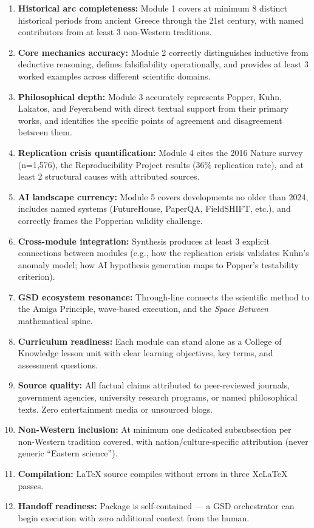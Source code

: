 \documentclass[11pt,letterpaper]{article}
\begin{document}
\begin{enumerate}
  \item \textbf{Historical arc completeness:} Module 1 covers at minimum 8 distinct historical periods from ancient Greece through the 21st century, with named contributors from at least 3 non-Western traditions.
  \item \textbf{Core mechanics accuracy:} Module 2 correctly distinguishes inductive from deductive reasoning, defines falsifiability operationally, and provides at least 3 worked examples across different scientific domains.
  \item \textbf{Philosophical depth:} Module 3 accurately represents Popper, Kuhn, Lakatos, and Feyerabend with direct textual support from their primary works, and identifies the specific points of agreement and disagreement between them.
  \item \textbf{Replication crisis quantification:} Module 4 cites the 2016 Nature survey (n=1,576), the Reproducibility Project results (36\% replication rate), and at least 2 structural causes with attributed sources.
  \item \textbf{AI landscape currency:} Module 5 covers developments no older than 2024, includes named systems (FutureHouse, PaperQA, FieldSHIFT, etc.), and correctly frames the Popperian validity challenge.
  \item \textbf{Cross-module integration:} Synthesis produces at least 3 explicit connections between modules (e.g., how the replication crisis validates Kuhn's anomaly model; how AI hypothesis generation maps to Popper's testability criterion).
  \item \textbf{GSD ecosystem resonance:} Through-line connects the scientific method to the Amiga Principle, wave-based execution, and the \emph{Space Between} mathematical spine.
  \item \textbf{Curriculum readiness:} Each module can stand alone as a College of Knowledge lesson unit with clear learning objectives, key terms, and assessment questions.
  \item \textbf{Source quality:} All factual claims attributed to peer-reviewed journals, government agencies, university research programs, or named philosophical texts. Zero entertainment media or unsourced blogs.
  \item \textbf{Non-Western inclusion:} At minimum one dedicated subsubsection per non-Western tradition covered, with nation/culture-specific attribution (never generic ``Eastern science'').
  \item \textbf{Compilation:} LaTeX source compiles without errors in three XeLaTeX passes.
  \item \textbf{Handoff readiness:} Package is self-contained --- a GSD orchestrator can begin execution with zero additional context from the human.
\end{enumerate}
\end{document}

